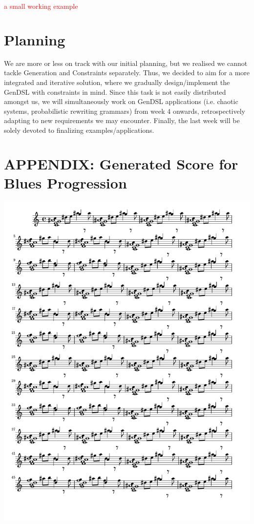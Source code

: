 \documentclass[11pt,a4paper]{article}
\newcommand\todo[1]{\textcolor{red}{#1}}
\begin{document}
\todo{a small working example}

\section{Planning}
We are more or less on track with our initial planning, but we realised we cannot tackle Generation and Constraints separately. Thus, we decided to aim for a more integrated and iterative solution, where we gradually design/implement the GenDSL with constraints in mind. Since this task is not easily distributed amongst us, we will simultaneously work on GenDSL applications (i.e. chaotic systems, probabilistic rewriting grammars) from week 4 onwards, retrospectively adapting to new requirements we may encounter. Finally, the last week will be solely devoted to finalizing examples/applications.

\startchronology
{}
\stopchronology

\newpage
\section*{\textsc{APPENDIX}: Generated Score for Blues Progression}
\includegraphics[scale=0.8]{blues.pdf}
\end{document}
